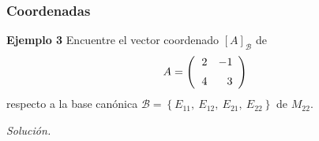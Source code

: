\begin{frame}\frametitle{Coordenadas}

%	

\vspace{0mm}

\begin{ej}{\textbf{Ejemplo 3}}
	Encuentre el vector coordenado $\left[ A \right]_{\mathcal{B}}$ de 
	\[
	A = 
	\left( 
	\begin{array}{@{\hspace{1\tabcolsep}}rr}	
	2 & -1 \\[2mm] 
	4 & 3
	\end{array} 
	\right)
	\]
	respecto a la base canónica $\mathcal{B} = \left\{ E_{11},\ E_{12},\ E_{21},\ E_{22} \right\}$ de $M_{22}$.
\end{ej}
\textit{Solución.}

\end{frame}


\subsection{}


